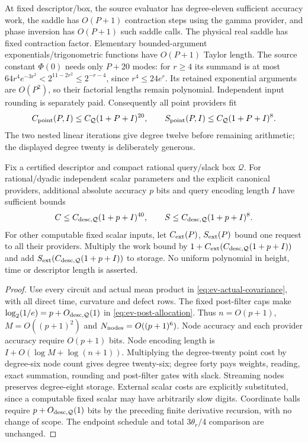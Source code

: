 At fixed descriptor/box, the source evaluator has degree-eleven
sufficient accuracy work, the saddle has $O(P+1)$ contraction steps
using the gamma provider, and phase inversion has $O(P+1)$ such
saddle calls. The physical real saddle has fixed contraction factor.
Elementary bounded-argument exponentials/trigonometric functions have
$O(P+1)$ Taylor length. The source constant $\Phi(0)$ needs only
$P+20$ modes: for $r\ge4$ its summand is at most
$64r^4e^{-3r^2}<2^{11-2r^2}\le2^{-r-4}$, since
$r^4\le24e^r$. Its retained exponential arguments are $O(P^2)$,
so their factorial lengths remain polynomial. Independent input
rounding is separately paid. Consequently all point providers fit
\begin{equation}
 C_{\rm point}(P,I)\le C_{\mathcal Q}(1+P+I)^{20},\qquad
 S_{\rm point}(P,I)\le C_{\mathcal Q}(1+P+I)^8.
 \label{eq:pc-point-cost}
\end{equation}
The two nested linear iterations give degree twelve before remaining
arithmetic; the displayed degree twenty is deliberately generous.

\begin{theorem}
\label{thm:polynomial-accuracy}
Fix a certified descriptor and compact rational query/slack box
$\mathcal Q$. For rational/dyadic independent scalar parameters and
the explicit canonical providers, additional absolute accuracy $p$
bits and query encoding length $I$ have sufficient bounds
\begin{equation}
 C\le C_{\rm desc,\mathcal Q}(1+p+I)^{40},\qquad
 S\le C_{\rm desc,\mathcal Q}(1+p+I)^8.
 \label{eq:pc-complete-cost}
\end{equation}
For other computable fixed scalar inputs, let $C_{\rm ext}(P)$,
$S_{\rm ext}(P)$ bound one request to all their providers. Multiply
the work bound by
$1+C_{\rm ext}(C_{\rm desc,\mathcal Q}(1+p+I))$ and add
$S_{\rm ext}(C_{\rm desc,\mathcal Q}(1+p+I))$ to storage.
No uniform polynomial in height, time or descriptor length is asserted.
\end{theorem}
\begin{proof}
Use every circuit and actual mean product in
\eqref{eq:ev-actual-covariance}, with all direct time, curvature and
defect rows. The fixed post-filter caps make
$\log_2(1/e)=p+O_{\rm desc,\mathcal Q}(1)$ in
\eqref{eq:ev-post-allocation}. Thus $n=O(p+1)$,
$M=O((p+1)^2)$ and $N_{\rm nodes}=O((p+1)^6)$.
Node accuracy and each provider accuracy require $O(p+1)$ bits.
Node encoding length is $I+O(\log M+\log(n+1))$. Multiplying
the degree-twenty point cost by degree-six node count gives degree
twenty-six; degree forty pays weights, reading, exact summation,
rounding and post-filter gates with slack. Streaming nodes preserves
degree-eight storage. External scalar costs are explicitly substituted,
since a computable fixed scalar may have arbitrarily slow digits.
Coordinate balls require $p+O_{\rm desc,\mathcal Q}(1)$ bits by
the preceding finite derivative recursion, with no change of scope.
The endpoint schedule and total $3\theta_r/4$ comparison are unchanged.
\end{proof}

